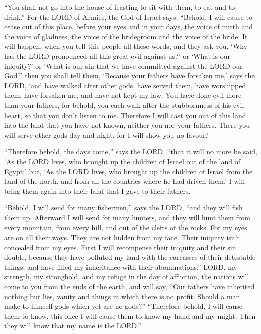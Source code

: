  ``You shall not go into the house of feasting to sit with
them, to eat and to drink.''  For the LORD of Armies, the
God of Israel says: ``Behold, I will cause to cease out of this place,
before your eyes and in your days, the voice of mirth and the voice of
gladness, the voice of the bridegroom and the voice of the bride.
 It will happen, when you tell this people all these words,
and they ask you, `Why has the LORD pronounced all this great evil
against us?' or `What is our iniquity?' or `What is our sin that we have
committed against the LORD our God?'  then you shall tell
them, `Because your fathers have forsaken me,' says the LORD, `and have
walked after other gods, have served them, have worshipped them, have
forsaken me, and have not kept my law.  You have done evil
more than your fathers, for behold, you each walk after the stubbornness
of his evil heart, so that you don't listen to me. 
Therefore I will cast you out of this land into the land that you have
not known, neither you nor your fathers. There you will serve other gods
day and night, for I will show you no favour.'

 ``Therefore behold, the days come,'' says the LORD, ``that
it will no more be said, `As the LORD lives, who brought up the children
of Israel out of the land of Egypt;'  but, `As the LORD
lives, who brought up the children of Israel from the land of the north,
and from all the countries where he had driven them.' I will bring them
again into their land that I gave to their fathers.

 ``Behold, I will send for many fishermen,'' says the LORD,
``and they will fish them up. Afterward I will send for many hunters,
and they will hunt them from every mountain, from every hill, and out of
the clefts of the rocks.  For my eyes are on all their
ways. They are not hidden from my face. Their iniquity isn't concealed
from my eyes.  First I will recompense their iniquity and
their sin double, because they have polluted my land with the carcasses
of their detestable things, and have filled my inheritance with their
abominations.''  LORD, my strength, my stronghold, and my
refuge in the day of affliction, the nations will come to you from the
ends of the earth, and will say, ``Our fathers have inherited nothing
but lies, vanity and things in which there is no profit. 
Should a man make to himself gods which yet are no gods?'' 
``Therefore behold, I will cause them to know, this once I will cause
them to know my hand and my might. Then they will know that my name is
the LORD.''

